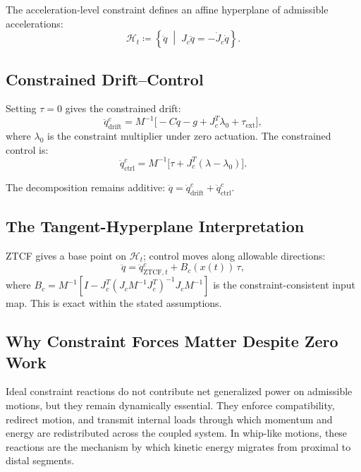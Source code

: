 \documentclass[11pt]{article}
\begin{document}
The acceleration-level constraint defines an affine hyperplane of admissible accelerations:
\begin{equation}\label{eq:hyperplane}
\mathcal{H}_t \coloneqq \left\{\ddot{q}\;\middle|\;J_c\ddot{q} = -\dot{J}_c\dot{q}\right\}.
\end{equation}

\subsection{Constrained Drift--Control}

Setting $\tau=0$ gives the constrained drift:
\begin{equation}\label{eq:constrained-drift}
\ddot{q}_{\mathrm{drift}}^{c} = M^{-1}\bigl[-C\dot{q}-g+J_c^T\lambda_0+\tau_{\mathrm{ext}}\bigr],
\end{equation}
where $\lambda_0$ is the constraint multiplier under zero actuation. The constrained control is:
\begin{equation}\label{eq:constrained-ctrl}
\ddot{q}_{\mathrm{ctrl}}^{c} = M^{-1}\bigl[\tau+J_c^T(\lambda-\lambda_0)\bigr].
\end{equation}

The decomposition remains additive: $\ddot{q} = \ddot{q}_{\mathrm{drift}}^{c} + \ddot{q}_{\mathrm{ctrl}}^{c}$.

\subsection{The Tangent-Hyperplane Interpretation}

ZTCF gives a base point on $\mathcal{H}_t$; control moves along allowable directions:
\begin{equation}\label{eq:hyperplane-control}
\ddot{q} = \ddot{q}_{\mathrm{ZTCF},t}^{c} + B_c(x(t))\,\tau,
\end{equation}
where $B_c = M^{-1}[I - J_c^T(J_cM^{-1}J_c^T)^{-1}J_cM^{-1}]$ is the constraint-consistent input map. This is exact within the stated assumptions.

\subsection{Why Constraint Forces Matter Despite Zero Work}

Ideal constraint reactions do not contribute net generalized power on admissible motions, but they remain dynamically essential. They enforce compatibility, redirect motion, and transmit internal loads through which momentum and energy are redistributed across the coupled system. In whip-like motions, these reactions are the mechanism by which kinetic energy migrates from proximal to distal segments.
\end{document}
